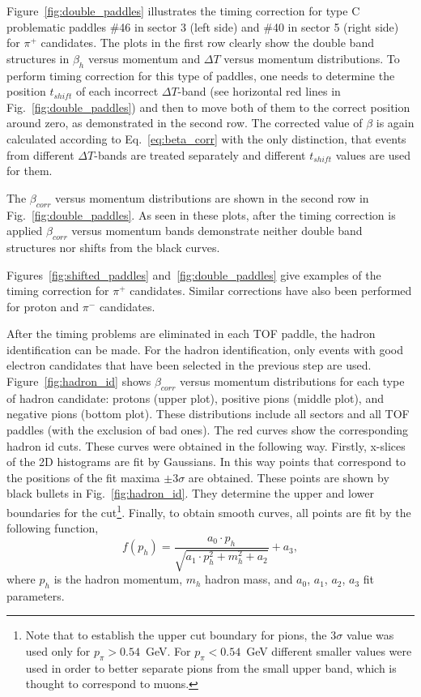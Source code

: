 Figure~\ref{fig:double_paddles} illustrates the timing correction for type C problematic paddles \#46 in sector 3 (left side) and \#40 in sector 5 (right side) for $\pi^+$ candidates. The plots in the first row clearly show the double band structures in $\beta_{h}$ versus momentum and $\Delta T$ versus momentum distributions. To perform timing correction for this type of paddles, one needs to determine the position $t_{shift}$ of each incorrect $\Delta T$-band (see horizontal red lines in Fig.~\ref{fig:double_paddles}) and then to move both of them to the correct position around zero, as demonstrated in the second row. The corrected value of $\beta$ is again calculated according to Eq.~\eqref{eq:beta_corr} with the only distinction, that events from different $\Delta T$-bands are treated separately and different $t_{shift}$ values are used for them.

The $\beta_{corr}$ versus momentum distributions are shown in the second row in Fig.~\ref{fig:double_paddles}. As seen in these plots, after the timing correction is applied $\beta_{corr}$ versus momentum bands demonstrate neither double band structures nor shifts from the black curves.


Figures~\ref{fig:shifted_paddles} and~\ref{fig:double_paddles} give examples of the timing correction for $\pi^+$ candidates. Similar corrections have also been performed for proton and $\pi^{-}$ candidates.


After the timing problems are eliminated in each TOF paddle, the hadron identification can be made. For the hadron identification, only events with good electron candidates that have been selected in the previous step are used. Figure~\ref{fig:hadron_id} shows $\beta_{corr}$ versus momentum distributions for each type of hadron candidate: protons (upper plot), positive pions (middle plot), and negative pions (bottom plot). These distributions include all sectors and all TOF paddles (with the exclusion of bad ones). The red curves show the corresponding hadron id cuts. These curves were obtained in the following way. Firstly, x-slices of the 2D histograms are fit by Gaussians. In this way points that correspond to the positions of the fit maxima $\pm 3\sigma$ are obtained. These points are shown by black bullets in Fig.~\ref{fig:hadron_id}. They determine the upper and lower boundaries for the cut\footnote[5]{Note that to establish the upper cut boundary for pions, the $3\sigma$ value was used only for $p_{\pi}>0.54$~GeV. For $p_{\pi}<0.54$~GeV different smaller values were used in order to better separate pions from the small upper band, which is thought to correspond to muons.}. Finally, to obtain smooth curves, all points are fit by the following function,
\begin{equation}
f(p_{h})=\frac{a_{0}\cdot p_{h}}{\sqrt{a_{1}\cdot p_{h}^{2}+m_{h}^{2}+a_{2}}}+a_{3},
\label{eq:fit_f}
\end{equation}
where $p_{h}$ is the hadron momentum, $m_{h}$ hadron mass, and $a_{0}$, $a_{1}$, $a_{2}$, $a_{3}$ fit parameters.

